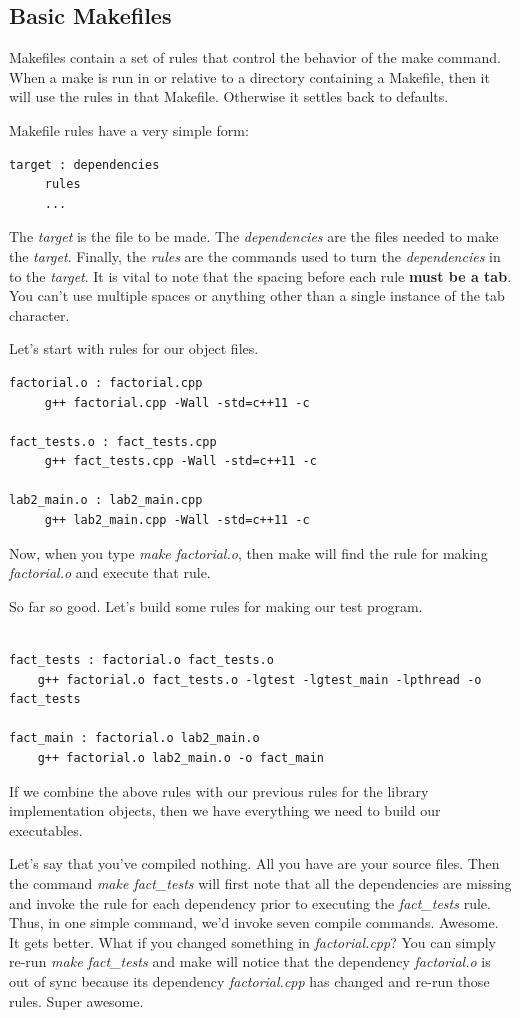 \documentclass[]{tufte-handout}
\begin{document}
\subsection{Basic Makefiles}


Makefiles contain a set of rules that control the behavior of the make command. When a make is run in or relative to a directory containing a Makefile, then it will use the rules in that Makefile. Otherwise it settles back to defaults.

Makefile rules have a very simple form:
\begin{verbatim}
target : dependencies
     rules
     ...
\end{verbatim}
The \textit{target} is the file to be made. The \textit{dependencies} are the files needed to make the \textit{target}. Finally, the \textit{rules} are the commands used to turn the \textit{dependencies} in to the \textit{target}.  It is vital to note that the spacing before each rule \textbf{must be a tab}.  You can't use multiple spaces or anything other than a single instance of the tab character.

Let's start with rules for our object files.
\begin{verbatim}
factorial.o : factorial.cpp
     g++ factorial.cpp -Wall -std=c++11 -c
     
fact_tests.o : fact_tests.cpp
     g++ fact_tests.cpp -Wall -std=c++11 -c

lab2_main.o : lab2_main.cpp
     g++ lab2_main.cpp -Wall -std=c++11 -c
\end{verbatim}
Now, when you type \textit{make factorial.o}, then make will find the rule for making \textit{factorial.o} and execute that rule. 

So far so good. Let's build some rules for making our test program.  
\begin{verbatim}

fact_tests : factorial.o fact_tests.o
    g++ factorial.o fact_tests.o -lgtest -lgtest_main -lpthread -o fact_tests
    
fact_main : factorial.o lab2_main.o
    g++ factorial.o lab2_main.o -o fact_main
\end{verbatim}
If we combine the above rules with our previous rules for the library implementation objects, then we have everything we need to build our executables.  

Let's say that you've compiled nothing. All you have are your source files. Then the command \textit{make fact\_tests} will first note that all the dependencies are missing and invoke the rule for each dependency prior to executing the \textit{fact\_tests} rule. Thus, in one simple command, we'd invoke seven compile commands. Awesome. It gets better. What if you changed something in \textit{factorial.cpp}? You can simply re-run \textit{make fact\_tests} and make will notice that the dependency \textit{factorial.o} is out of sync because its dependency \textit{factorial.cpp} has changed and re-run those rules. Super awesome.
\end{document}
